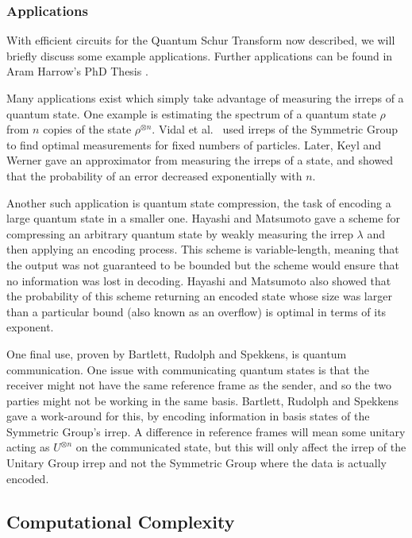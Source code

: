 \subsubsection{Applications}

With efficient circuits for the Quantum Schur Transform now described, we will briefly discuss some example applications. Further applications can be found in Aram Harrow's PhD Thesis \cite{harrow2005}.

Many applications exist which simply take advantage of measuring the irreps of a quantum state. One example is estimating the spectrum of a quantum state $\rho$ from $n$ copies of the state $\rho^{\otimes n}$. Vidal et al.~\cite{vidal1999} used irreps of the Symmetric Group to find optimal measurements for fixed numbers of particles. Later, Keyl and Werner \cite{keyl2001} gave an approximator from measuring the irreps of a state, and showed that the probability of an error decreased exponentially with $n$.

Another such application is quantum state compression, the task of encoding a large quantum state in a smaller one. Hayashi and Matsumoto \cite{hayashi2002, hayashi2002simple} gave a scheme for compressing an arbitrary quantum state by weakly measuring the irrep $\lambda$ and then applying an encoding process. This scheme is variable-length, meaning that the output was not guaranteed to be bounded but the scheme would ensure that no information was lost in decoding. Hayashi and Matsumoto also showed that the probability of this scheme returning an encoded state whose size was larger than a particular bound (also known as an overflow) is optimal in terms of its exponent.

One final use, proven by Bartlett, Rudolph and Spekkens\cite{bartlett2001}, is quantum communication. One issue with communicating quantum states is that the receiver might not have the same reference frame as the sender, and so the two parties might not be working in the same basis. Bartlett, Rudolph and Spekkens gave a work-around for this, by encoding information in basis states of the Symmetric Group's irrep. A difference in reference frames will mean some unitary acting as $U^{\otimes n}$ on the communicated state, but this will only affect the irrep of the Unitary Group irrep and not the Symmetric Group where the data is actually encoded.

\subsection{Computational Complexity}
\label{ssec:schur-simulation}

